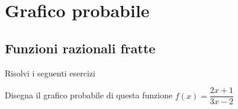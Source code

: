 \chapter{Grafico probabile}
\section{Funzioni razionali fratte}
Risolvi i seguenti esercizi
\tcbstartrecording

%	
%	
%	
%		
%		
%		
%		
%		
%		
\begin{exercise}[no solution]
Disegna il grafico probabile di questa funzione $f(x)= \dfrac{2x+1}{3x-2}$
\end{exercise}
